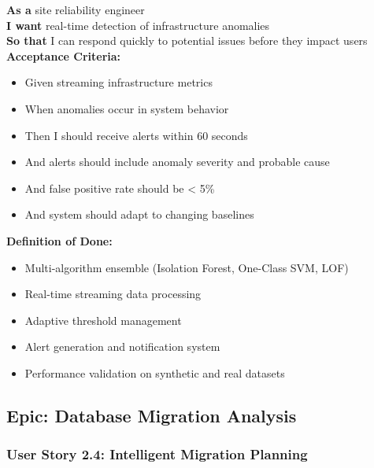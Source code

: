 \begin{tcolorbox}[colback=lightgray, colframe=primaryblue, title=US-2.3: Real-time Anomaly Detection]
\textbf{As a} site reliability engineer \\
\textbf{I want} real-time detection of infrastructure anomalies \\
\textbf{So that} I can respond quickly to potential issues before they impact users \\

\textbf{Acceptance Criteria:}
\begin{itemize}
    \item Given streaming infrastructure metrics
    \item When anomalies occur in system behavior
    \item Then I should receive alerts within 60 seconds
    \item And alerts should include anomaly severity and probable cause
    \item And false positive rate should be < 5\%
    \item And system should adapt to changing baselines
\end{itemize}

\textbf{Definition of Done:}
\begin{itemize}
    \item Multi-algorithm ensemble (Isolation Forest, One-Class SVM, LOF)
    \item Real-time streaming data processing
    \item Adaptive threshold management
    \item Alert generation and notification system
    \item Performance validation on synthetic and real datasets
\end{itemize}
\end{tcolorbox}

\subsection{Epic: Database Migration Analysis}

\subsubsection{User Story 2.4: Intelligent Migration Planning}


